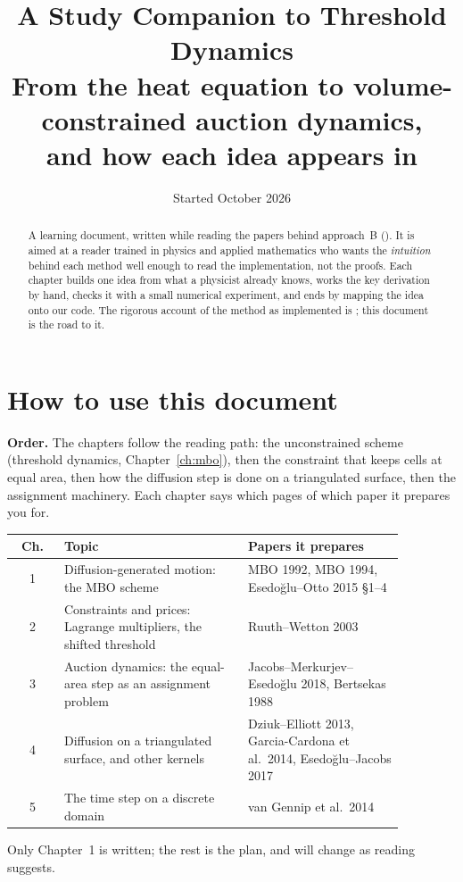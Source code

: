 \documentclass[11pt,a4paper]{report}
\title{\textbf{A Study Companion to Threshold Dynamics}\\[0.5em]
  \large From the heat equation to volume-constrained auction dynamics,\\
  and how each idea appears in \codefile{src/partition/mbo\_auction.py}}
\author{}
\date{Started October 2026}
\begin{document}
\sloppy
\maketitle

\begin{abstract}
A learning document, written while reading the papers behind approach~B
(). It is aimed
at a reader trained in physics and applied mathematics who wants the
\emph{intuition} behind each method well enough to read the implementation, not
the proofs. Each chapter builds one idea from what a physicist already knows,
works the key derivation by hand, checks it with a small numerical experiment,
and ends by mapping the idea onto our code. The rigorous account of the method
as implemented is ; this document is
the road to it.
\end{abstract}

\tableofcontents

\chapter*{How to use this document}

\textbf{Order.} The chapters follow the reading path: the unconstrained scheme
(threshold dynamics, Chapter~\ref{ch:mbo}), then the constraint that keeps cells
at equal area, then how the diffusion step is done on a triangulated surface,
then the assignment machinery. Each chapter says which pages of which paper it
prepares you for.

\begin{center}
\small
\begin{tabular}{@{}cp{0.47\linewidth}p{0.40\linewidth}@{}}
\toprule
Ch. & Topic & Papers it prepares \\
\midrule
1 & Diffusion-generated motion: the MBO scheme & MBO 1992, MBO 1994, Esedo\u{g}lu--Otto 2015 \S1--4 \\
2 & Constraints and prices: Lagrange multipliers, the shifted threshold & Ruuth--Wetton 2003 \\
3 & Auction dynamics: the equal-area step as an assignment problem & Jacobs--Merkurjev--Esedo\u{g}lu 2018, Bertsekas 1988 \\
4 & Diffusion on a triangulated surface, and other kernels & Dziuk--Elliott 2013, Garcia-Cardona et al.\ 2014, Esedo\u{g}lu--Jacobs 2017 \\
5 & The time step on a discrete domain & van Gennip et al.\ 2014 \\
\bottomrule
\end{tabular}
\end{center}
Only Chapter~1 is written; the rest is the plan, and will change as reading
suggests.
\end{document}
